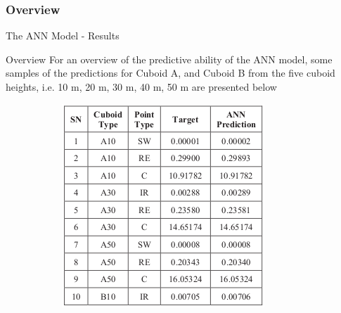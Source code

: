 \documentclass{beamer}
\begin{document}
\subsubsection{Overview}
\begin{frame}{The ANN Model - Results}
    \begin{block}{Overview}
    \justifying
        For an overview of the predictive ability of the ANN model, some samples of the predictions for Cuboid A, and Cuboid B from the five cuboid heights, i.e. 10 m, 20 m, 30 m, 40 m, 50 m are presented below
        \begin{figure}
         \centering
         \begin{subfigure}[b]{0.32\textwidth}
             \centering
             \includegraphics[width=\textwidth]{Figures/ANN-overview1.png}
         \end{subfigure}
         \hfill
         \begin{subfigure}[b]{0.32\textwidth}
             \centering

\end{subfigure}
\end{figure}
\end{block}
\end{frame}
\end{document}
